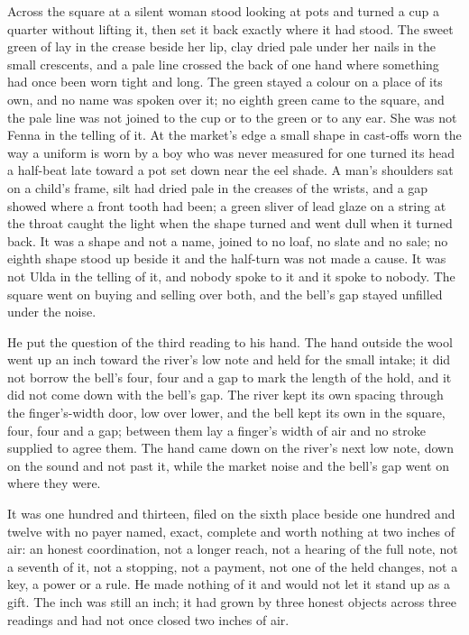 Across the square at  a silent woman stood looking at pots and turned a cup a quarter without lifting it, then set it back exactly where it had stood. The sweet green of  lay in the crease beside her lip, clay dried pale under her nails in the small crescents, and a pale line crossed the back of one hand where something had once been worn tight and long. The green stayed a colour on a place of its own, and no name was spoken over it; no eighth green came to the square, and the pale line was not joined to the cup or to the green or to any ear. She was not Fenna in the telling of it. At the market's edge a small shape in cast-offs worn the way a uniform is worn by a boy who was never measured for one turned its head a half-beat late toward a pot set down near the eel shade. A man's shoulders sat on a child's frame, silt had dried pale in the creases of the wrists, and a gap showed where a front tooth had been; a green sliver of lead glaze on a string at the throat caught the light when the shape turned and went dull when it turned back. It was a shape and not a name, joined to no loaf, no slate and no sale; no eighth shape stood up beside it and the half-turn was not made a cause. It was not Ulda in the telling of it, and nobody spoke to it and it spoke to nobody. The square went on buying and selling over both, and the bell's gap stayed unfilled under the noise.

He put the question of the third reading to his hand. The hand outside the wool went up an inch toward the river's low note and held for the small intake; it did not borrow the bell's four, four and a gap to mark the length of the hold, and it did not come down with the bell's gap. The river kept its own spacing through the finger's-width door, low over lower, and the bell kept its own in the square, four, four and a gap; between them lay a finger's width of air and no stroke supplied to agree them. The hand came down on the river's next low note, down on the sound and not past it, while the market noise and the bell's gap went on where they were.

It was one hundred and thirteen, filed on the sixth place beside one hundred and twelve with no payer named, exact, complete and worth nothing at two inches of air: an honest coordination, not a longer reach, not a hearing of the full note, not a seventh of it, not a stopping, not a payment, not one of the held changes, not a key, a power or a rule. He made nothing of it and would not let it stand up as a gift. The inch was still an inch; it had grown by three honest objects across three readings and had not once closed two inches of air.

